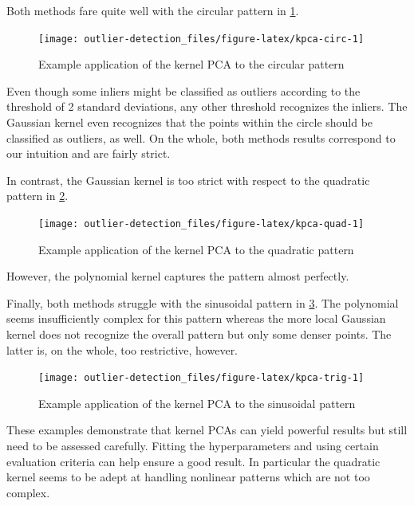 \documentclass[]{report}
\theoremstyle{definition}
\theoremstyle{definition}
\theoremstyle{definition}
\theoremstyle{remark}
\begin{document}
Both methods fare quite well with the circular pattern in
\ref{fig:kpca-circ}.

\begin{figure}

{\centering \texttt{[image: outlier-detection\_files/figure-latex/kpca-circ-1]} 

}

\caption{Example application of the kernel PCA to the circular pattern}\label{fig:kpca-circ}
\end{figure}

Even though some inliers might be classified as outliers according to
the threshold of 2 standard deviations, any other threshold recognizes
the inliers. The Gaussian kernel even recognizes that the points within
the circle should be classified as outliers, as well. On the whole, both
methods results correspond to our intuition and are fairly strict.

In contrast, the Gaussian kernel is too strict with respect to the
quadratic pattern in \ref{fig:kpca-quad}.

\begin{figure}

{\centering \texttt{[image: outlier-detection\_files/figure-latex/kpca-quad-1]} 

}

\caption{Example application of the kernel PCA to the quadratic pattern}\label{fig:kpca-quad}
\end{figure}

However, the polynomial kernel captures the pattern almost perfectly.

Finally, both methods struggle with the sinusoidal pattern in
\ref{fig:kpca-trig}. The polynomial seems insufficiently complex for
this pattern whereas the more local Gaussian kernel does not recognize
the overall pattern but only some denser points. The latter is, on the
whole, too restrictive, however.

\begin{figure}

{\centering \texttt{[image: outlier-detection\_files/figure-latex/kpca-trig-1]} 

}

\caption{Example application of the kernel PCA to the sinusoidal pattern}\label{fig:kpca-trig}
\end{figure}

These examples demonstrate that kernel PCAs can yield powerful results
but still need to be assessed carefully. Fitting the hyperparameters and
using certain evaluation criteria can help ensure a good result. In
particular the quadratic kernel seems to be adept at handling nonlinear
patterns which are not too complex.
\end{document}
